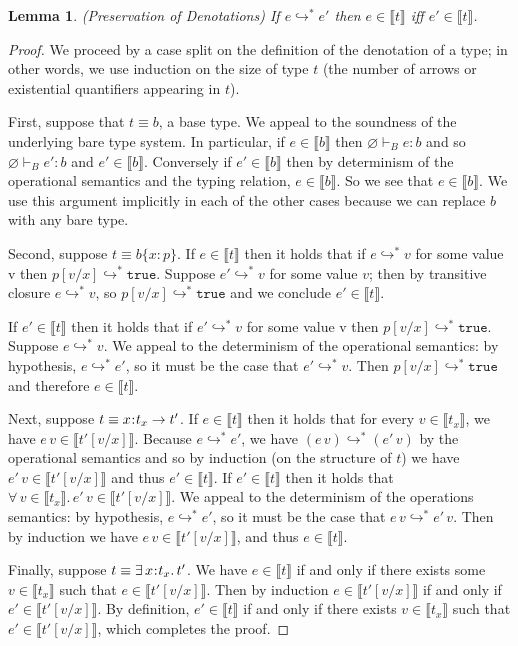 \documentclass[11pt]{article}
\newtheorem{lemma}[theorem]{Lemma}
\newcommand{\bind}{\hspace{0.05em}{:}\hspace{0.05em}} %
\newcommand{\col}{\mathbin{:}}       %
\newcommand{\lb}{\llbracket}         %
\newcommand{\rb}{\rrbracket}         %
\newcommand{\many}{\hookrightarrow^*}
\newcommand{\true}{\mathtt{true}}
\begin{document}
\begin{lemma}{(Preservation of Denotations)
If $e \hookrightarrow^* e'$ then $e \in \lb t\rb$ iff $e' \in \lb t\rb$.}\label{pres-den}
\end{lemma}
\begin{proof}
We proceed by a case split on the definition of the denotation of a type; in other words, we use induction on the size of type $t$ (the number of arrows or existential quantifiers appearing in $t$).

First, suppose that $t \equiv b$, a base type. We appeal to the soundness of the underlying bare type system. In particular, if
$e \in \lb b \rb$ then $\varnothing \vdash_B e : b$ and so $\varnothing \vdash_B e' : b$ and $e' \in \lb b \rb$.
Conversely if $e' \in \lb b \rb$ then by determinism of the operational semantics and the typing relation, $e \in \lb b \rb$. So we see that $e \in \lb b\rb$. We use this argument implicitly in each of the other cases because we can replace $b$ with any bare type.

Second, suppose $t \equiv b\{x\col p\}$.
If $e \in \lb t\rb$ then it holds that 
if $e \many v$ for some value v then $p[v/x] \many \true$.
Suppose $e' \many v$ for some value $v$; then by transitive closure $e \many v$, so $p[v/x] \many \true$ and we conclude $e' \in \lb t \rb$.

If $e' \in \lb t\rb$ then it holds that %
if $e' \many v$ for some value v then $p[v/x] \many \true$. Suppose $e \many v$. We appeal to the determinism of the operational semantics: by hypothesis, $e \many e'$, so it must be the case that $e' \many v$. Then $p[v/x] \many \true$ and %
therefore $e \in \lb t \rb$.

Next, suppose $t \equiv x\bind t_x \rightarrow t'$.
If $e \in \lb t\rb$ then it holds that %
for every $v \in \lb t_x \rb$, we have $e\, v \in \lb t'[v/x]\rb$.
Because $e \many e'$, we have $(e\, v) \many (e'\, v)$ by the operational semantics and so by induction (on the structure of  $t$) we have $e'\, v \in \lb t'[v/x]\rb$ and thus $e' \in \lb t\rb$.
If $e' \in \lb t\rb$ then it holds that %
$\forall\, v \in \lb t_x \rb.\, e'\, v \in \lb t'[v/x]\rb$.
We appeal to the determinism of the operations semantics: by hypothesis, $e \many e'$, so it must be the case that $e\, v \many e'\, v$. Then by induction we have $e\, v \in \lb t'[v/x]\rb$, and thus $e\in\lb t\rb$.

Finally, suppose $t \equiv \exists\, x\bind t_x.\, t'$. We have $e \in \lb t \rb$ if and only if there exists some $v \in \lb t_x \rb$ such that 
$e \in \lb t'[v/x]\rb$. Then by induction $e \in \lb t'[v/x]\rb$ if and only if $e' \in \lb t'[v/x]\rb$. By definition, $e' \in \lb t\rb$ if and only if there exists $v \in \lb t_x\rb$ such that $e'\in\lb t'[v/x]\rb$, which completes the proof.
\end{proof}
\end{document}
